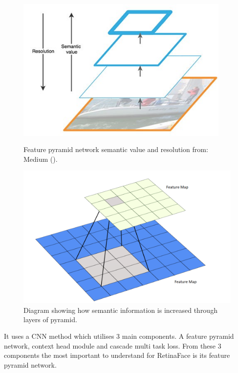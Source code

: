 \documentclass{l4proj}
\begin{document}
\begin{figure}[h!]
  \centering
    \begin{minipage}{0.49\textwidth}
    \includegraphics[width=0.94\textwidth]{images/fp_semantics.jpeg}
     \vspace*{-0.6mm}
    \caption{Feature pyramid network semantic value and resolution from: Medium (\cite{fpnsemantic}).}
    \label{fpnsemantic}
  \end{minipage}
  \hfill
  \centering
  \begin{minipage}{0.49\textwidth}
    \includegraphics[width=\textwidth]{images/fp_scaling.PNG}
    \caption{Diagram showing how semantic information is increased through layers of pyramid.}
    \label{fp_scaling}
  \end{minipage}
  \hfill
\end{figure}
It uses a CNN method which utilises 3 main components. A feature pyramid network, context head module and cascade multi task loss. From these 3 components the most important to understand for RetinaFace is its feature pyramid network.
\end{document}
